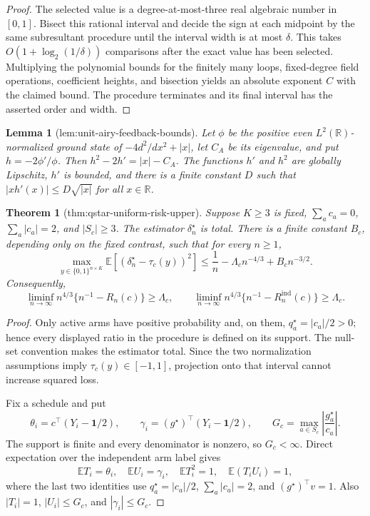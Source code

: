 \documentclass{article}
\newtheorem{theorem}{Theorem}
\newtheorem{lemma}{Lemma}
\begin{document}
{\begin{proof}
The selected value is a degree-at-most-three real algebraic number in \([0,1]\).  Bisect this rational interval and decide the sign at each midpoint by the same subresultant procedure until the interval width is at most \(\delta\).  This takes
\(O(1+\log_2(1/\delta))\) comparisons after the exact value has been selected.  Multiplying the polynomial bounds for the finitely many loops, fixed-degree field operations, coefficient heights, and bisection yields an absolute exponent \(C\) with the claimed bound.  The procedure terminates and its final interval has the asserted order and width.
\end{proof}

\begin{lemma}[lem:unit-airy-feedback-bounds]\label{lem:unit-airy-feedback-bounds}
Let \(\phi\) be the positive even \(L^2(\mathbb R)\)-normalized ground state of \(-4d^2/dx^2+|x|\), let \(C_A\) be its eigenvalue, and put \(h=-2\phi'/\phi\).  Then \(h^2-2h'=|x|-C_A\).  The functions \(h'\) and \(h^2\) are globally Lipschitz, \(h'\) is bounded, and there is a finite constant \(D\) such that \(|x h'(x)|\le D\sqrt{|x|}\) for all \(x\in\mathbb R\).
\end{lemma}

\begin{theorem}[thm:qstar-uniform-risk-upper]\label{thm:qstar-uniform-risk-upper}
Suppose \(K\ge3\) is fixed, \(\sum_ac_a=0\), \(\sum_a|c_a|=2\), and \(|S_c|\ge3\).  The estimator \(\delta_n^\star\) is total.  There is a finite constant \(B_c\), depending only on the fixed contrast, such that for every \(n\ge1\),
\[
\max_{y\in\{0,1\}^{n\times K}}\mathbb E\!\left[(\delta_n^\star-\tau_c(y))^2\right]
\le \frac1n-\Lambda_cn^{-4/3}+B_cn^{-3/2}.
\]
Consequently,
\[
\liminf_{n\to\infty}n^{4/3}\{n^{-1}-R_n(c)\}\ge\Lambda_c,
\qquad
\liminf_{n\to\infty}n^{4/3}\{n^{-1}-R_n^{\mathrm{ind}}(c)\}\ge\Lambda_c.
\]
\end{theorem}
\begin{proof}
Only active arms have positive probability and, on them,
\(q_a^\star=|c_a|/2>0\); hence every displayed ratio in the procedure is defined on its support.  The null-set convention makes the estimator total.  Since the two normalization assumptions imply \(\tau_c(y)\in[-1,1]\), projection onto that interval cannot increase squared loss.

Fix a schedule and put
\[
\theta_i=c^\top(Y_i-\mathbf1/2),\qquad
\gamma_i=(g^\star)^\top(Y_i-\mathbf1/2),
\qquad G_c=\max_{a\in S_c}\left|\frac{g_a^\star}{c_a}\right|.
\]
The support is finite and every denominator is nonzero, so \(G_c<\infty\).  Direct expectation over the independent arm label gives
\[
\mathbb ET_i=\theta_i,\quad \mathbb EU_i=\gamma_i,\quad
\mathbb ET_i^2=1,\quad \mathbb E(T_iU_i)=1,
\tag{1}
\]
where the last two identities use \(q_a^\star=|c_a|/2\),
\(\sum_a|c_a|=2\), and \((g^\star)^\top v=1\).  Also
\(|T_i|=1\), \(|U_i|\le G_c\), and \(|\gamma_i|\le G_c\).


\end{proof}}
\end{document}

